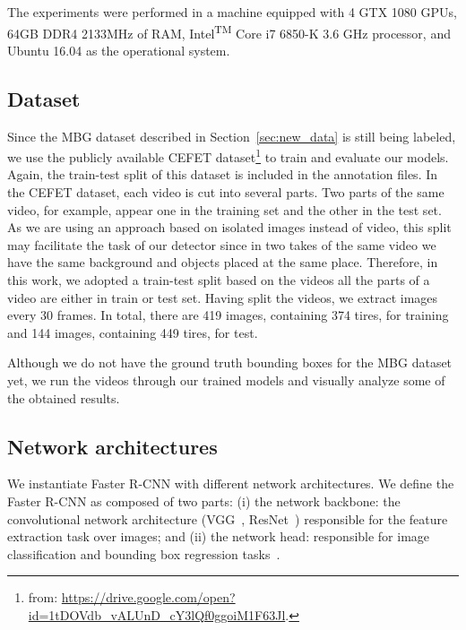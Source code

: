 The experiments were performed in a machine equipped with 4 GTX 1080 GPUs, 64GB DDR4 2133MHz of RAM, Intel\textsuperscript{TM} Core i7 6850-K 3.6 GHz processor, and Ubuntu 16.04 as the operational system.


\subsection{Dataset}
%
Since the MBG dataset described in Section~\ref{sec:new_data} is still being labeled, we use the publicly available CEFET dataset\footnote{from: \url{https://drive.google.com/open?id=1tDOVdb_vALUnD_cY3lQf0ggoiM1F63Jl}.} to train and evaluate our models.
Again, the train-test split of this dataset is included in the annotation files.
In the CEFET dataset, each video is cut into several parts.
Two parts of the same video, for example, appear one in the training set and the other in the test set.
As we are using an approach based on isolated images instead of video, this split may facilitate the task of our detector since in two takes of the same video we have the same background and objects placed at the same place.
%
Therefore, in this work, we adopted a train-test split based on the videos \ie all the parts of a video are either in train or test set.
Having split the videos, we extract images every 30 frames.
In total, there are 419 images, containing 374 tires,  for training and 144 images, containing 449 tires,  for test.



Although we do not have the ground truth bounding boxes for the MBG dataset yet, we run the videos through our trained models and visually analyze some of the obtained results.

%
\subsection{Network architectures}
We instantiate Faster R-CNN with different network architectures.
We define the Faster R-CNN as composed of two parts:
(i) the network backbone: the convolutional network architecture (\eg VGG~\cite{Simonyan2015VGG}, ResNet~\cite{He2016deep}) responsible for the feature extraction task over images; and
(ii) the network head: responsible for image classification and bounding box regression tasks~\cite{He2017mask}.

